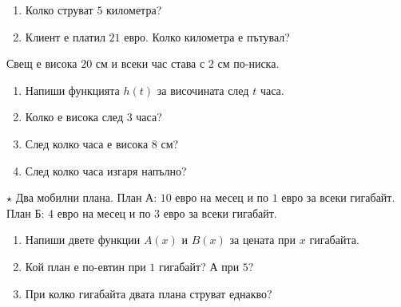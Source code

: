\documentclass[11pt,a4paper]{article}
\makeatletter
\newcommand{\st}{\textcolor{corange}{$\star$}}
\newcommand{\bgalph}[1]{\expandafter\@bgalph\csname c@#1\endcsname}
\newcommand{\@bgalph}[1]{\ifcase#1\or а\or б\or в\or г\or д\or е\or ж\or з\or и\or к\fi}
\makeatother
\begin{document}
\begin{tasks}
\begin{enumerate}[label=\bgalph*)]
    \item Колко струват $5$ километра?
    \item Клиент е платил $21$ евро. Колко километра е пътувал?
  \end{enumerate}
  \item Свещ е висока $20$ см и всеки час става с $2$ см по-ниска.
  \begin{enumerate}[label=\bgalph*)]
    \item Напиши функцията $h(t)$ за височината след $t$ часа.
    \item Колко е висока след $3$ часа?
    \item След колко часа е висока $8$ см?
    \item След колко часа изгаря напълно?
  \end{enumerate}
  \needspace{4cm}
  \item \st{} Два мобилни плана. План А: $10$ евро на месец и по $1$ евро за всеки гигабайт. План Б: $4$ евро на месец и по $3$ евро за всеки гигабайт.
  \begin{enumerate}[label=\bgalph*)]
    \item Напиши двете функции $A(x)$ и $B(x)$ за цената при $x$ гигабайта.
    \item Кой план е по-евтин при $1$ гигабайт? А при $5$?
    \item При колко гигабайта двата плана струват еднакво?
  \end{enumerate}
\end{tasks}
\end{document}
